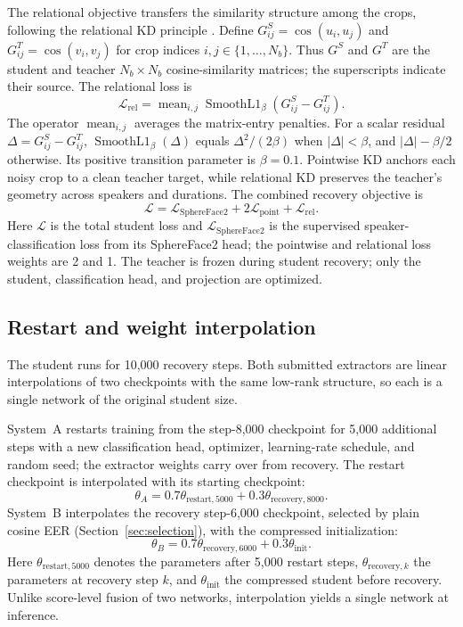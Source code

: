 \documentclass[11pt]{article}
\begin{document}
The relational objective transfers the similarity structure among the crops, following the relational KD principle \citep{park2019rkd}. Define $G^S_{ij}=\cos(u_i,u_j)$ and $G^T_{ij}=\cos(v_i,v_j)$ for crop indices $i,j\in\{1,\ldots,N_b\}$. Thus $G^S$ and $G^T$ are the student and teacher $N_b\times N_b$ cosine-similarity matrices; the superscripts indicate their source. The relational loss is
\begin{equation}
 \mathcal L_{\mathrm{rel}}=\operatorname{mean}_{i,j}
 \operatorname{SmoothL1}_{\beta}(G^S_{ij}-G^T_{ij}).
\end{equation}
The operator $\operatorname{mean}_{i,j}$ averages the matrix-entry penalties. For a scalar residual $\Delta=G^S_{ij}-G^T_{ij}$, $\operatorname{SmoothL1}_{\beta}(\Delta)$ equals $\Delta^2/(2\beta)$ when $|\Delta|<\beta$, and $|\Delta|-\beta/2$ otherwise. Its positive transition parameter is $\beta=0.1$. Pointwise KD anchors each noisy crop to a clean teacher target, while relational KD preserves the teacher's geometry across speakers and durations. The combined recovery objective is
\begin{equation}
 \mathcal L=\mathcal L_{\mathrm{SphereFace2}}
       +2\mathcal L_{\mathrm{point}}+\mathcal L_{\mathrm{rel}}.
\end{equation}
Here $\mathcal L$ is the total student loss and $\mathcal L_{\mathrm{SphereFace2}}$ is the supervised speaker-classification loss from its SphereFace2 head; the pointwise and relational loss weights are 2 and 1. The teacher is frozen during student recovery; only the student, classification head, and projection are optimized.

\subsection{Restart and weight interpolation}
The student runs for 10,000 recovery steps. Both submitted extractors are linear interpolations of two checkpoints with the same low-rank structure, so each is a single network of the original student size.

System~A restarts training from the step-8,000 checkpoint for 5,000 additional steps with a new classification head, optimizer, learning-rate schedule, and random seed; the extractor weights carry over from recovery. The restart checkpoint is interpolated with its starting checkpoint:
\begin{equation}
 \theta_A=0.7\theta_{\mathrm{restart},5000}
       +0.3\theta_{\mathrm{recovery},8000}.
\end{equation}
System~B interpolates the recovery step-6,000 checkpoint, selected by plain cosine EER (Section~\ref{sec:selection}), with the compressed initialization:
\begin{equation}
 \theta_B=0.7\theta_{\mathrm{recovery},6000}
       +0.3\theta_{\mathrm{init}}.
\end{equation}
Here $\theta_{\mathrm{restart},5000}$ denotes the parameters after 5,000 restart steps, $\theta_{\mathrm{recovery},k}$ the parameters at recovery step $k$, and $\theta_{\mathrm{init}}$ the compressed student before recovery. Unlike score-level fusion of two networks, interpolation yields a single network at inference.
\end{document}
